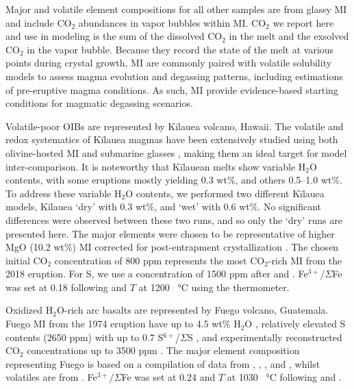 \documentclass[draft, english]{volcanica-template}
\begin{document}
Major and volatile element compositions for all other samples are from glassy MI and include CO$_2$ abundances in vapor bubbles within MI. CO$_2$ we report here and use in modeling is the sum of the dissolved CO$_2$ in the melt and the exsolved CO$_2$ in the vapor bubble. Because they record the state of the melt at various points during crystal growth, MI are commonly paired with volatile solubility models to assess magma evolution and degassing patterns, including estimations of pre-eruptive magma conditions. As such, MI provide evidence-based starting conditions for magmatic degassing scenarios.

Volatile-poor OIBs are represented by Kīlauea volcano, Hawai{\okina}i. The volatile and redox systematics of Kīlauea magmas have been extensively studied using both olivine-hosted MI \parencite{sides2014magma, wieser2021reconstructing, lerner2021petrologic, moore2015bubbles, lerner2021improving, moussallam2016impact, tucker2019high} and submarine glasses \parencite{dixon1991degassing, clague1995petrology}, making them an ideal target for model inter-comparison. It is noteworthy that Kīlauean melts show variable H$_2$O contents, with some eruptions mostly yielding 0.3 wt\%, and others 0.5--1.0 wt\%. To address these variable H$_2$O contents, we performed two different Kīlauea models, Kīlauea `dry' with 0.3 wt\%, and `wet' with 0.6 wt\%. No significant differences were observed between these two runs, and so only the `dry' runs are presented here. The major elements were chosen to be representative of higher MgO (10.2 wt\%) MI corrected for post-entrapment crystallization \parencite{wieser2020chalcophile, wieser2021reconstructing, lerner2021improving}. The chosen initial CO$_2$ concentration of 800 ppm represents the most CO$_2$-rich MI from the 2018 eruption. For S, we use a concentration of 1500 ppm after \textcite{wieser2020chalcophile} and \textcite{sides2014magma}. Fe$^{3+}$/$\Sigma$Fe was set at 0.18 following \textcite{lerner2021petrologic} and $T$ at 1200 \SI{}{\celsius} using the \textcite{helz1987geothermometry} thermometer. 

Oxidized H$_2$O-rich arc basalts are represented by Fuego volcano, Guatemala. Fuego MI from the 1974 eruption have up to 4.5 wt\% H$_2$O \parencite{rasmussen2020vapor}, relatively elevated S contents (2650 ppm) with up to 0.7 S$^{6+}$/$\Sigma$S \parencite{taracsak2023sulfur}, and experimentally reconstructed CO$_2$ concentrations up to 3500 ppm \parencite{rasmussen2020vapor}. The major element composition representing Fuego is based on a compilation of data from \textcite{rasmussen2020vapor}, \textcite{lloyd2013}, \textcite{moore2015bubbles}, and \textcite{newcombe2020}, whilst volatiles are from \textcite{rasmussen2020vapor}. Fe$^{3+}$/$\Sigma$Fe was set at 0.24 and $T$ at 1030 \SI{}{\celsius} following \textcite{lloyd2013} and \textcite{Ding2023}.
\end{document}
